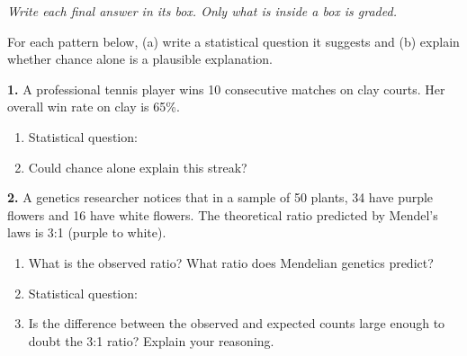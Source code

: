\documentclass[10pt]{article}
\begin{document}
{\small\itshape Write each final answer in its box. Only what is inside a box is graded.}\par

\vspace{0.1in}

\begin{practicebox}
\small
For each pattern below, (a) write a statistical question it suggests and (b) explain
whether chance alone is a plausible explanation.

\vspace{8pt}
\textbf{1.} A professional tennis player wins 10 consecutive matches on clay courts.
Her overall win rate on clay is 65\%.

\begin{enumerate}[label=(\alph*), leftmargin=2em, itemsep=8pt]
  \item Statistical question:\\
  \item Could chance alone explain this streak?\\
\end{enumerate}

\vspace{8pt}
\textbf{2.} A genetics researcher notices that in a sample of 50 plants, 34 have
purple flowers and 16 have white flowers. The theoretical ratio predicted by Mendel's
laws is 3:1 (purple to white).

\begin{enumerate}[label=(\alph*), leftmargin=2em, itemsep=8pt]
  \item What is the observed ratio? \makebox[3cm][r]{\smash{\gradedblank[id=hw2a1, type=short, points=1, answer={34:16 = 2.125:1}, check=text]{1.9cm}{0.15in}}} \quad
        What ratio does Mendelian genetics predict? \makebox[3cm][r]{\smash{\gradedblank[id=hw2a2, type=short, points=1, answer=3:1, check=text]{1.9cm}{0.15in}}}
\tcbbreak
  \item Statistical question:\\
  \item Is the difference between the observed and expected counts large enough to doubt
        the 3:1 ratio? Explain your reasoning.\\
\end{enumerate}


\end{practicebox}
\end{document}
